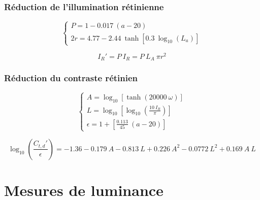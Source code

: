 	\subsection*{Réduction de l'illumination rétinienne}
	\begin{equation}
		\begin{cases}
		P = 1 - 0.017~(a - 20)\\
		2r = 4.77 - 2.44~\tanh[0.3~\log_{10}(L_a)]
		\end{cases}
		\label{eq:anxe_step_50}
	\end{equation}
	
	\begin{equation}
		I_R' = P~I_R = P~L_A~\pi r^2
		\label{eq:anxe_step_51}
	\end{equation}
	
	\subsection*{Réduction du contraste rétinien}
	\begin{equation}
		\begin{cases}
		A = \log_{10} \left[ \tanh(20000~\omega) \right]\\
		L = \log_{10} \left[ \log_{10} \left( \frac{10~I_R}{\pi} \right) \right]\\
		\epsilon = 1 + \left[ \frac{0.113}{45}~(a - 20) \right]
		\end{cases}
		\label{eq:anxe_step_50}
	\end{equation}
	
	\begin{equation}
		\log_{10} \left( \frac{C_{t,d}'}{\epsilon} \right) = -1.36 -0.179~A - 0.813~L + 0.226~A^2 - 0.0772~L^2 + 0.169~A~L
		\label{eq:anxe_step_51}
	\end{equation}
	
	\chapter*{Mesures de luminance}
	
